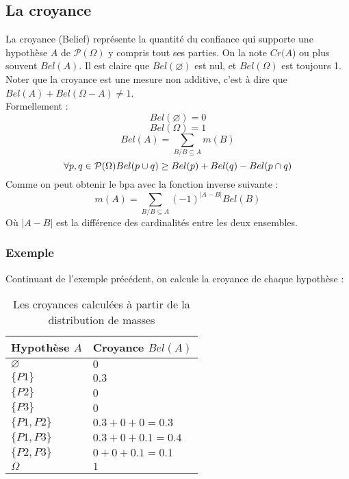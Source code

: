 \subsection{La croyance}

La croyance (Belief) représente la quantité du confiance qui supporte une hypothèse $A$ de 
$\mathcal{P}(\Omega)$ y compris tout ses parties. On la note $Cr(A$) ou plus souvent $Bel(A)$. Il est
claire que $Bel(\varnothing)$ est nul, et $Bel(\Omega)$ est toujours 1. Noter que la croyance est une
mesure non additive, c’est à dire que $Bel(A) + Bel(\Omega - A) \neq 1$.\\
Formellement :
\begin{equation}
Bel(\varnothing)=0
\end{equation}
\begin{equation}
Bel(\Omega)=1
\end{equation}
\begin{equation}
Bel(A) = \sum_{B \slash B \subseteq A} m(B)
\end{equation}
\begin{equation}
\forall p,q \in \mathcal{P}(\Omega) \medskip Bel(p \cup q) \geq Bel(p) + Bel(q) - Bel(p \cap q)
\end{equation}
Comme on peut obtenir le bpa avec la fonction inverse suivante :
\begin{equation}
m(A) = \sum_{B \slash B \subseteq A} (-1)^{|A-B|} Bel(B)
\end{equation}
Où $|A-B|$ est la différence des cardinalités entre les deux ensembles.

\subsubsection{Exemple}
Continuant de l'exemple précédent, on calcule la croyance de chaque hypothèse :

\begin{table}[h]
\begin{center}
\begin{tabular}{|l|l|}
\hline
Hypothèse $A$ & Croyance $Bel(A)$\\
\hline
$\varnothing$ & $0$ \\
\hline
$\{P1\}$ & $0.3$ \\
\hline
$\{P2\}$ & $0$ \\
\hline
$\{P3\}$ & $0$ \\
\hline
$\{P1, P2\}$ & $0.3 + 0 + 0 = 0.3$ \\
\hline
$\{P1, P3\}$ & $0.3 + 0 + 0.1 = 0.4$ \\
\hline
$\{P2, P3\}$ & $0 + 0 + 0.1 = 0.1$ \\
\hline
$\Omega$ & $1$ \\
\hline
\end{tabular}
\caption{Les croyances calculées à partir de la distribution de masses}
\end{center}
\end{table}

